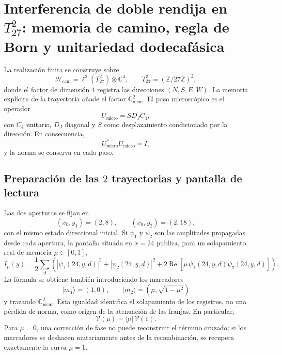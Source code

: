 \section{Interferencia de doble rendija en \(T^2_{27}\): memoria de camino, regla de Born y unitariedad dodecafásica}
\label{sec:md-sucesora-interferometria-t27}

La realización finita se construye sobre
\[
 \mathcal H_{\mathrm{cam}}
 =\ell^2\!\left(T_{27}^{2}\right)\otimes\mathbb C^4,
 \qquad
 T_{27}^{2}=(\mathbb Z/27\mathbb Z)^2,
\]
donde el factor de dimensión \(4\) registra las direcciones
\((N,S,E,W)\). La memoria explícita de la trayectoria añade el factor
\(\mathbb C^2_{\mathrm{mem}}\). El paso microscópico es el operador
\begin{equation}
 U_{\mathrm{micro}}=S D_J C_4,
 \label{eq:md-sucesora-interferometro-microstep}
\end{equation}
con \(C_4\) unitario, \(D_J\) diagonal y \(S\) como desplazamiento condicionado
por la dirección. En consecuencia,
\[
 U_{\mathrm{micro}}^*U_{\mathrm{micro}}=I,
\]
y la norma se conserva en cada paso.

\subsection{Preparación de las \(2\) trayectorias y pantalla de lectura}

Las dos aperturas se fijan en
\[
 (x_0,y_1)=(2,8),
 \qquad
 (x_0,y_2)=(2,18),
\]
con el mismo estado direccional inicial. Si \(\psi_1\) y \(\psi_2\) son las
amplitudes propagadas desde cada apertura, la pantalla situada en \(x=24\)
publica, para un solapamiento real de memoria \(\mu\in[0,1]\),
\begin{equation}
 I_\mu(y)
 =\frac12\sum_d
 \left(
  |\psi_1(24,y,d)|^2+|\psi_2(24,y,d)|^2
  +2\operatorname{Re}\!\left[
   \mu\,\overline{\psi_1(24,y,d)}\psi_2(24,y,d)
  \right]
 \right).
 \label{eq:md-sucesora-interferometro-intensidad}
\end{equation}
La fórmula se obtiene también introduciendo los marcadores
\[
 |m_1\rangle=(1,0),
 \qquad
 |m_2\rangle=(\mu,\sqrt{1-\mu^2})
\]
y trazando \(\mathbb C^2_{\mathrm{mem}}\). Esta igualdad identifica el
solapamiento de los registros, no una pérdida de norma, como origen de la
atenuación de las franjas. En particular,
\begin{equation}
 \mathcal V(\mu)=|\mu|\,\mathcal V(1).
 \label{eq:md-sucesora-interferometro-visibilidad}
\end{equation}
Para \(\mu=0\), una corrección de fase no puede reconstruir el término cruzado;
si los marcadores se deshacen unitariamente antes de la recombinación, se
recupera exactamente la curva \(\mu=1\).

